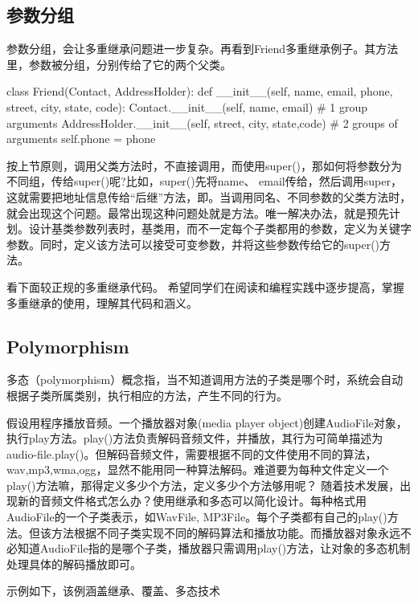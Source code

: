 \subsection{参数分组}
参数分组，会让多重继承问题进一步复杂。再看到Friend多重继承例子。其方法里，参数被分组，分别传给了它的两个父类。
\begin{python}
class Friend(Contact, AddressHolder):
    def __init__(self,
                name,
                email,
                phone,
                street,
                city,
                state,
                code):
        Contact.__init__(self, name, email)  # 1 group arguments
        AddressHolder.__init__(self, street, city, state,code)  # 2 groups of arguments
        self.phone = phone
\end{python}
按上节原则，调用父类方法时，不直接调用，而使用super()，那如何将参数分为不同组，传给super()呢?比如，super()先将name、 email传给，然后调用super，这就需要把地址信息传给“后继”方法，即。当调用同名、不同参数的父类方法时，就会出现这个问题。最常出现这种问题处就是方法。唯一解决办法，就是预先计划。设计基类参数列表时，基类用，而不一定每个子类都用的参数，定义为关键字参数。同时，定义该方法可以接受可变参数，并将这些参数传给它的super()方法。
  
看下面较正规的多重继承代码。
希望同学们在阅读和编程实践中逐步提高，掌握多重继承的使用，理解其代码和涵义。
\subsection{Polymorphism}
多态（polymorphism）概念指，当不知道调用方法的子类是哪个时，系统会自动根据子类所属类别，执行相应的方法，产生不同的行为。

假设用程序播放音频。一个播放器对象(media player object)创建AudioFile对象，执行play方法。play()方法负责解码音频文件，并播放，其行为可简单描述为audio-file.play()。但解码音频文件，需要根据不同的文件使用不同的算法，wav,mp3,wma,ogg，显然不能用同一种算法解码。难道要为每种文件定义一个play()方法嘛，那得定义多少个方法，定义多少个方法够用呢？ 随着技术发展，出现新的音频文件格式怎么办？使用继承和多态可以简化设计。每种格式用AudioFile的一个子类表示，如WavFile, MP3File。每个子类都有自己的play()方法。但该方法根据不同子类实现不同的解码算法和播放功能。而播放器对象永远不必知道AudioFile指的是哪个子类，播放器只需调用play()方法，让对象的多态机制处理具体的解码播放即可。

示例如下，该例涵盖继承、覆盖、多态技术

